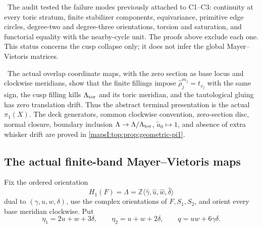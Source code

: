 \begin{test}
\label{mapsI:top:remark:L600}
\ The audit tested the failure modes previously attached to C1--C3:
continuity at every toric stratum, finite stabilizer components, equivariance,
primitive edge circles, degree-two and degree-three orientations, torsion and
saturation, and functorial equality with the nearby-cycle unit.  The proofs
above exclude each one.  This status concerns the cusp collapse only; it does
not infer the global Mayer--Vietoris matrices.
\end{test}

\begin{auditrecord}
\label{mapsI:top:record:vankampen}
\ The actual overlap coordinate maps, with the zero section as
base locus and clockwise meridians, show that the
finite fillings impose $\widehat\rho_j^{m_j}=t_{v_j}$ with the same sign,
the cusp filling kills $\Lambda_{\rm tor}$ and its toric meridian, and the
tautological gluing has zero translation drift.  Thus the abstract terminal
presentation is the actual $\pi_1(X)$.  The deck generators, common clockwise
convention, zero-section disc, normal closure, boundary inclusion
$\Lambda\to\Lambda/\Lambda_{\rm tor}$,
$\widetilde a_0\mapsto1$, and absence of extra whisker drift are proved in
\cref{mapsI:top:prop:geometric-pi1}.
\end{auditrecord}

\subsection{The actual finite-band Mayer--Vietoris maps}

Fix the ordered orientation
\[
H_1(F)=\Lambda=
\mathbb Z\langle\widehat\gamma,\widehat u,
                    \widehat w,\widehat\delta\rangle
\]
dual to $(\gamma,u,w,\delta)$, use the complex orientations of
$F,S_1,S_2$, and orient every base meridian clockwise.  Put
\[
 \eta_1=2u+w+3\delta,
 \qquad \eta_2=u+w+2\delta,
 \qquad q=uw+6\gamma\delta.
\tag{TM.MV.1}
\]

